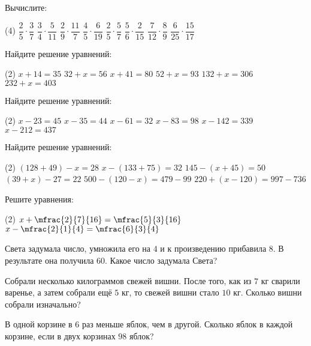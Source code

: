 \begin{class}[number=3]
	\begin{listofex}
		\item Вычислите:\begin{tasks}(4)
			\task \( \dfrac{2}{5}\cdot\dfrac{3}{7} \)
			\task \( \dfrac{3}{4}\cdot\dfrac{5}{11} \)
			\task \( \dfrac{2}{9}\cdot\dfrac{11}{7} \)
			\task \( \dfrac{4}{5}\cdot\dfrac{6}{19} \)
			\task \( \dfrac{2}{5}\cdot\dfrac{5}{7} \)
			\task \( \dfrac{5}{6}\cdot\dfrac{2}{15} \)
			\task \( \dfrac{7}{12}\cdot\dfrac{8}{9} \)
			\task \( \dfrac{6}{25}\cdot\dfrac{15}{17} \)
		\end{tasks}
		\item Найдите решение уравнений: \begin{tasks}(2)
			\task \( x +14 = 35 \) 
			\task \( 32 + x = 56 \) 
			\task \(  x + 41 = 80 \) 
			\task \( 52 + x = 93 \) 
			\task \( 132 + x = 306 \) 
			\task \( 232 + x = 403  \)   
		\end{tasks}
		\item Найдите решение уравнений: \begin{tasks}(2)
			\task \( x - 23 = 45 \) 
			\task \( x - 35 = 44 \) 
			\task \( x - 61 = 32 \) 
			\task \( x - 83 = 98\) 
			\task \( x - 142 = 339\) 
			\task \( x - 212 = 437  \)     
		\end{tasks}
		\item Найдите решение уравнений: \begin{tasks}(2)
			\task \( (128 + 49) - x = 28 \)
			\task \( x - (133 + 75) = 32 \)
			\task \( 145 - (x + 45) = 50 \)
			\task \( (39 + x) - 27 = 22 \)
			\task \( 500 - (120 - x) = 479-99 \)
			\task \( 220 + (x - 120) =997 -736 \)
		\end{tasks}
		\item Решите уравнения:
		\begin{tasks}(2)
			\task \( x+\mfrac{2}{7}{16}=\mfrac{5}{3}{16} \)
			\task \( x-\mfrac{2}{1}{4}= \mfrac{6}{3}{4}\)
		\end{tasks}
		\item Света задумала число, умножила его на \( 4 \) и к произведению прибавила \( 8 \). В результате она получила \( 60 \). Какое число задумала Света?
		\item Собрали несколько килограммов свежей вишни. После того, как из \( 7 \) кг сварили варенье, а затем собрали ещё \( 5 \) кг, то свежей вишни стало \( 10 \) кг. Сколько вишни собрали изначально?
		\item В одной корзине в \( 6 \) раз меньше яблок, чем в другой. Сколько яблок в каждой корзине, если в двух корзинах \( 98 \) яблок?
	\end{listofex}
\end{class}

